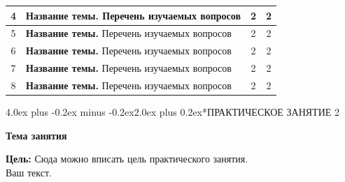 \documentclass[12pt, a4paper]{book}%
\makeatletter
\renewcommand{\section}{\@startsection{section}{1}{1pt}%
{4.0ex plus -0.2ex minus -0.2ex}{2.0ex plus 0.2ex}{\centering\bf}}%
\makeatother
\begin{document}
{{\begin{center}
\begin{longtable}{|c|p{12cm}|c|c|}
\hline %
4& {\bf Название темы.} Перечень изучаемых вопросов  & 2  & 2  \\
\hline %
5& {\bf Название темы.} Перечень изучаемых вопросов  & 2  & 2  \\
\hline %
6& {\bf Название темы.} Перечень изучаемых вопросов  & 2  & 2  \\
\hline %
7& {\bf Название темы.} Перечень изучаемых вопросов  & 2  & 2  \\
\hline %
8& {\bf Название темы.} Перечень изучаемых вопросов  & 2  & 2  \\
\hline %

\end{longtable}%
\end{center}}%




\newpage%
\section*{ПРАКТИЧЕСКОЕ ЗАНЯТИЕ 2}%
 \vspace{-10pt}%
\begin{center}%
 {\bf%
 Тема занятия}
\end{center}%

{\bf Цель:} Сюда можно вписать цель практического занятия.
\\%

Ваш текст.

\newpage%
}
\end{document}
